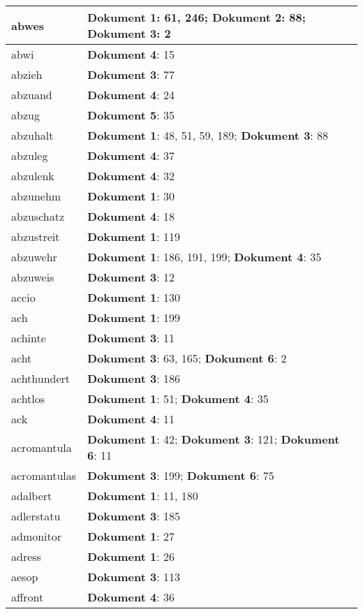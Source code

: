 \documentclass[a5paper]{article}
\begin{document}
\begin{longtable}[l]{|l|p{3in}|}
\hline
abwes & \textbf{Dokument 1}: 61, 246; \textbf{Dokument 2}: 88; \textbf{Dokument 3}: 2 \\
\hline
abwi & \textbf{Dokument 4}: 15 \\
\hline
abzieh & \textbf{Dokument 3}: 77 \\
\hline
abzuand & \textbf{Dokument 4}: 24 \\
\hline
abzug & \textbf{Dokument 5}: 35 \\
\hline
abzuhalt & \textbf{Dokument 1}: 48, 51, 59, 189; \textbf{Dokument 3}: 88 \\
\hline
abzuleg & \textbf{Dokument 4}: 37 \\
\hline
abzulenk & \textbf{Dokument 4}: 32 \\
\hline
abzunehm & \textbf{Dokument 1}: 30 \\
\hline
abzuschatz & \textbf{Dokument 4}: 18 \\
\hline
abzustreit & \textbf{Dokument 1}: 119 \\
\hline
abzuwehr & \textbf{Dokument 1}: 186, 191, 199; \textbf{Dokument 4}: 35 \\
\hline
abzuweis & \textbf{Dokument 3}: 12 \\
\hline
accio & \textbf{Dokument 1}: 130 \\
\hline
ach & \textbf{Dokument 1}: 199 \\
\hline
achinte & \textbf{Dokument 3}: 11 \\
\hline
acht & \textbf{Dokument 3}: 63, 165; \textbf{Dokument 6}: 2 \\
\hline
achthundert & \textbf{Dokument 3}: 186 \\
\hline
achtlos & \textbf{Dokument 1}: 51; \textbf{Dokument 4}: 35 \\
\hline
ack & \textbf{Dokument 4}: 11 \\
\hline
acromantula & \textbf{Dokument 1}: 42; \textbf{Dokument 3}: 121; \textbf{Dokument 6}: 11 \\
\hline
acromantulas & \textbf{Dokument 3}: 199; \textbf{Dokument 6}: 75 \\
\hline
adalbert & \textbf{Dokument 1}: 11, 180 \\
\hline
adlerstatu & \textbf{Dokument 3}: 185 \\
\hline
admonitor & \textbf{Dokument 1}: 27 \\
\hline
adress & \textbf{Dokument 1}: 26 \\
\hline
aesop & \textbf{Dokument 3}: 113 \\
\hline
affront & \textbf{Dokument 4}: 36 \\

\end{longtable}
\end{document}

